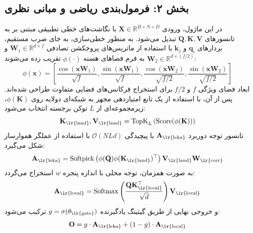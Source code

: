 \subsection*{بخش ۲: فرمول‌بندی ریاضی و مبانی نظری }
در این ماژول، ورودی $\mathbf{X} \in \mathbb{R}^{B \times N \times D}$ با نگاشت‌های خطی تطبیقی مبتنی بر  به تانسورهای $\mathbf{Q}, \mathbf{K}, \mathbf{V}$ تبدیل می‌شود. به منظور خطی‌سازی، به جای ضرب مستقیم، بردارهای $\mathbf{q}_i$ و $\mathbf{k}_j$ با استفاده از ماتریس‌های پروجکشن تصادفی $\mathbf{W}_1 \in \mathbb{R}^{d \times f}$ و $\mathbf{W}_2 \in \mathbb{R}^{d \times (f/2)}$ به فرم فضاهای هسته $\phi(\cdot)$ تقریب زده می‌شوند:
\begin{equation}
\phi(\mathbf{x}) = \left[ \frac{\cos(\mathbf{x} \mathbf{W}_1)}{\sqrt{f}}, \frac{\sin(\mathbf{x} \mathbf{W}_1)}{\sqrt{f}}, \frac{\cos(\mathbf{x} \mathbf{W}_2)}{\sqrt{f/2}}, \frac{\sin(\mathbf{x} \mathbf{W}_2)}{\sqrt{f/2}} \right]
\end{equation}
ابعاد فضای ویژگی $f$ و $f/2$ برای استخراج فرکانس‌های فضایی متفاوت طراحی شده‌اند.
پس از آن، با استفاده از یک تابع امتیازدهی  مجهز به شبکه‌ای دو‌لایه  روی $\phi(\mathbf{K})$، زیرمجموعه‌ای از $L$ توکن برجسته  انتخاب می‌شود:
\begin{equation}
\mathbf{K}_{\text{\lr{land}}}, \mathbf{V}_{\text{\lr{land}}} = \operatorname{TopK}_{L} \left( \operatorname{Score}(\phi(\mathbf{K})) \right)
\end{equation}
تانسور توجه دوربرد $\mathbf{A}_{\text{\lr{leka}}}$ با پیچیدگی $\mathcal{O}(N L d)$ با استفاده از عملگر هموارساز  شکل می‌گیرد:
\begin{equation}
\mathbf{A}_{\text{\lr{leka}}} = \operatorname{Softpick} \left( \phi(\mathbf{Q}) \phi(\mathbf{K}_{\text{\lr{land}}})^\top \right) \mathbf{V}_{\text{\lr{land}}} \mathbf{W}_{\text{\lr{corr}}}
\end{equation}
به صورت همزمان، توجه محلی با اندازه پنجره $w$ استخراج می‌گردد:
\begin{equation}
\mathbf{A}_{\text{\lr{local}}} = \operatorname{Softmax}\left( \frac{\mathbf{Q} \mathbf{K}^\top_{\text{\lr{local}}}}{\sqrt{d}} \right) \mathbf{V}_{\text{\lr{local}}}
\end{equation}
و خروجی نهایی از طریق گیتینگ یادگیرنده $g = \sigma(\theta_{\text{\lr{gate}}})$ ترکیب می‌شود:
\begin{equation}
\mathbf{O} = g \cdot \mathbf{A}_{\text{\lr{leka}}} + (1 - g) \cdot \mathbf{A}_{\text{\lr{local}}}
\end{equation}

